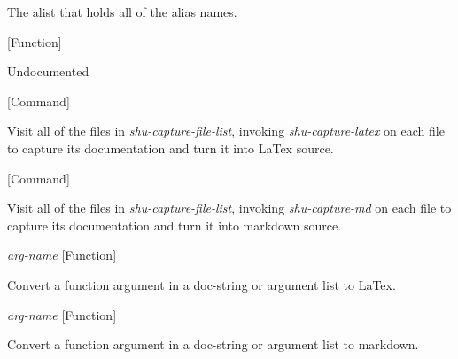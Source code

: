 \begin{doc-string}
The alist that holds all of the alias names.
\end{doc-string}

\vspace{1em}
\noindent
{}
\usebox{\funcname}
 \hfill [Function]

\begin{doc-string}
Undocumented
\end{doc-string}

\vspace{1em}
\noindent
{}
\usebox{\funcname}
 \hfill [Command]

\begin{doc-string}
Visit all of the files in \emph{shu-capture-file-list}, invoking \emph{shu-capture-latex} on
each file to capture its documentation and turn it into LaTex source.
\end{doc-string}

\vspace{1em}
\noindent
{}
\usebox{\funcname}
 \hfill [Command]

\begin{doc-string}
Visit all of the files in \emph{shu-capture-file-list}, invoking \emph{shu-capture-md} on each
file to capture its documentation and turn it into markdown source.
\end{doc-string}

\vspace{1em}
\noindent
{}
\usebox{\funcname}\emph{arg-name}
 \hfill [Function]

\begin{doc-string}
Convert a function argument in a doc-string or argument list to LaTex.
\end{doc-string}

\vspace{1em}
\noindent
{}
\usebox{\funcname}\emph{arg-name}
 \hfill [Function]

\begin{doc-string}
Convert a function argument in a doc-string or argument list to markdown.
\end{doc-string}

